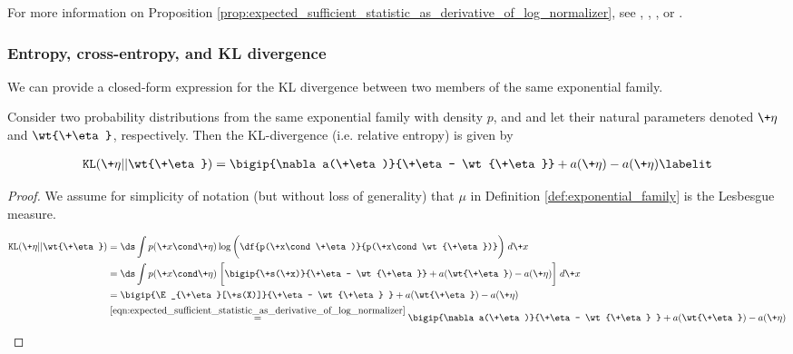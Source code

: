 \documentclass{article} %
\newcommand{\obs}{\+x}
\newcommand{\logNormalizerFunction}{a}
\newcommand{\sufficientStatsFunction}{\+s}
\newcommand{\naturalParam}{\+\eta}
\begin{document}
For more information on Proposition \ref{prop:expected_sufficient_statistic_as_derivative_of_log_normalizer}, see \citet{jordan2010exponential}, \citet{jordan2010conjugate}, \citet{nielsen2010entropies}, or \citet{nielsen2009statistical}.   

\subsubsection{Entropy, cross-entropy, and KL divergence}

We can provide a closed-form expression for the KL divergence between two members of the same exponential family. 

\begin{proposition}
Consider two probability distributions from the same exponential family with density $p$, and and let their natural  parameters denoted $\naturalParam$ and $\wt{\naturalParam}$, respectively.  Then the KL-divergence (i.e. relative entropy) is given by

\begin{align*}
\texttt{KL}(\naturalParam || \wt{\naturalParam}) = \bigip{\nabla \logNormalizerFunction(\naturalParam)}{\naturalParam - \wt{\naturalParam}} + \logNormalizerFunction(\naturalParam) - \logNormalizerFunction(\naturalParam) 
\labelit \label{eqn:KL_divergence_between_two_members_of_the_sample_exponential_family}
\end{align*}
 


\begin{proof}
We assume for simplicity of notation (but without loss of generality) that $\mu$ in Definition \ref{def:exponential_family} is the Lesbesgue measure. 

\begin{align*}
\texttt{KL}(\naturalParam || \wt{\naturalParam}) &= \ds\int p(\obs \cond \naturalParam) \log \bigg( \df{p(\obs \cond \naturalParam)}{p(\obs \cond \wt{\naturalParam})}\bigg) \;d\obs \\ 
& = \ds\int p(\obs \cond \naturalParam) \; \bigg[ \bigip{\sufficientStatsFunction(\obs)}{\naturalParam - \wt{\naturalParam}}  + \logNormalizerFunction(\wt{\naturalParam}) - \logNormalizerFunction(\naturalParam) \bigg] \; d\obs \\
&= \bigip{\E_{\naturalParam}[\sufficientStatsFunction(X)]}{\naturalParam - \wt{\naturalParam} } + \logNormalizerFunction(\wt{\naturalParam}) - \logNormalizerFunction(\naturalParam) \\
& \stackrel{\eqref{eqn:expected_sufficient_statistic_as_derivative_of_log_normalizer}}{=}  \bigip{\nabla \logNormalizerFunction(\naturalParam)}{\naturalParam - \wt{\naturalParam} } + \logNormalizerFunction(\wt{\naturalParam}) - \logNormalizerFunction(\naturalParam)
\end{align*}
	
\end{proof}
\label{prop:kl_divergence_between_members_of_same_exponential_family}
\end{proposition}
\end{document}
